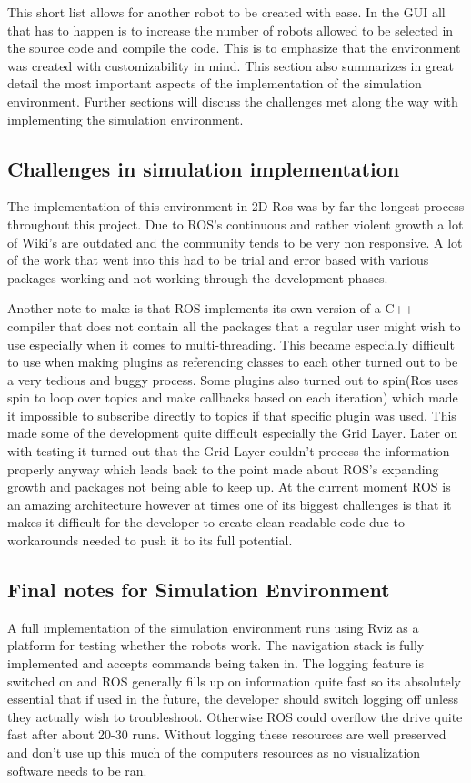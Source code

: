       This short list allows for another robot to be created with ease. In the GUI all that has to happen is to increase the number of robots allowed to be selected in the source code and compile the code. This is to emphasize that the environment was created with customizability in mind. This section also summarizes in great detail the most important aspects of the implementation of the simulation environment. Further sections will discuss the challenges met along the way with implementing the simulation environment.

    \subsection{Challenges in simulation implementation}
      The implementation of this environment in 2D Ros was by far the longest process throughout this project. Due to ROS's continuous and rather violent growth a lot of Wiki's are outdated and the community tends to be very non responsive. A lot of the work that went into this had to be trial and error based with various packages working and not working through the development phases.

      Another note to make is that ROS implements its own version of a C++ compiler that does not contain all the packages that a regular user might wish to use especially when it comes to multi-threading. This became especially difficult to use when making plugins as referencing classes to each other turned out to be a very tedious and buggy process. Some plugins also turned out to spin(Ros uses spin to loop over topics and make callbacks based on each iteration) which made it impossible to subscribe directly to topics if that specific plugin was used. This made some of the development quite difficult especially the Grid Layer. Later on with testing it turned out that the Grid Layer couldn't process the information properly anyway which leads back to the point made about ROS's expanding growth and packages not being able to keep up. At the current moment ROS is an amazing architecture however at times one of its biggest challenges is that it makes it difficult for the developer to create clean readable code due to workarounds needed to push it to its full potential.

    \subsection{Final notes for Simulation Environment}
      A full implementation of the simulation environment runs using Rviz as a platform for testing whether the robots work. The navigation stack is fully implemented and accepts commands being taken in. The logging feature is switched on and ROS generally fills up on information quite fast so its absolutely essential that if used in the future, the developer should switch logging off unless they actually wish to troubleshoot. Otherwise ROS could overflow the drive quite fast after about 20-30 runs. Without logging these resources are well preserved and don't use up this much of the computers resources as no visualization software needs to be ran.


